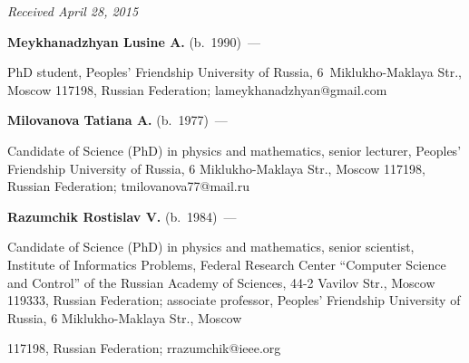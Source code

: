\vspace*{-3pt}





\hfill{\small\textit{Received April 28, 2015}}













\Contr





\noindent


\textbf{Meykhanadzhyan Lusine A.} (b.\ 1990)~---


PhD student, Peoples' Friendship University of Russia, 6~Miklukho-Maklaya Str., Moscow 117198, Russian Federation; lameykhanadzhyan@gmail.com





\vspace*{3pt}





\noindent


\textbf{Milovanova Tatiana A.} (b.\ 1977)~---


Candidate of Science (PhD) in physics and mathematics, senior lecturer, Peoples' Friendship University of Russia, 6 Miklukho-Maklaya Str., Moscow 117198, Russian Federation; tmilovanova77@mail.ru





\vspace*{3pt}





\noindent


\textbf{Razumchik Rostislav V.} (b.\ 1984)~---


Candidate of Science (PhD) in physics and mathematics, senior scientist, Institute of Informatics Problems, Federal Research Center ``Computer Science and Control'' of the Russian Academy of Sciences, 44-2 Vavilov Str., Moscow 119333, Russian Federation; associate professor, Peoples' Friendship University of Russia, 6 Miklukho-Maklaya Str., Moscow


117198, Russian Federation; rrazumchik@ieee.org





\label{end\stat}








\renewcommand{\bibname}{\protect\rm Литература} 